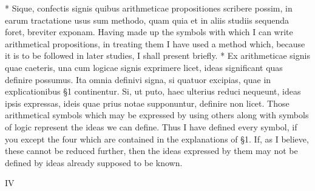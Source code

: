 \documentclass{book}
\newcommand{\s}{\switchcolumn} %
\newcommand{\peanoPage}[1]{\vspace{1ex}

  \columnratio{0.475, 0.05, 0.475} \begin{paracol}{3} \centering \hdashrule{\columnwidth}{0.1mm}{0.1mm 1mm} \s #1 \s \hdashrule{\columnwidth}{0.1mm}{0.1mm 1mm} \end{paracol}

\vspace{1ex}}
\newenvironment{translateTwoCol}
               { %
                 \columnratio{0.5, 0.5}
                 \begin{paracol}{2}
                 \newcommand{\LAT}{\switchcolumn[0]*}
                 \newcommand{\ENG}{\switchcolumn[1]}
               }
               { %
                 \let\ENG\undefined
                 \let\LAT\undefined
                 \end{paracol}
               }
\begin{document}
\begin{translateTwoCol}
\LAT
Sique, confectis signis quibus arithmeticae propositiones scribere possim, in earum tractatione usus sum methodo, quam quia et in aliis studiis sequenda foret, breviter exponam.
\ENG Having made up the symbols with which I can write arithmetical propositions, in treating them I have used a method which, because it is to be followed in later studies, I shall present briefly.
\LAT
Ex arithmeticae signis quae caeteris, una cum logicae signis exprimere licet, ideas significant quas definire possumus. Ita omnia definivi signa, si quatuor excipias, quae in explicationibus \S 1 continentur. Si, ut puto, haec ulterius reduci nequeunt, ideas ipsis expressas, ideis quae prius notae supponuntur, definire non licet.
\ENG Those arithmetical symbols which may be expressed by using others along with symbols of logic represent the ideas we can define. Thus I have defined every symbol, if you except the four which are contained in the explanations of \S 1. If, as I believe, these cannot be reduced further, then the ideas expressed by them may not be defined by ideas already supposed to be known.
\end{translateTwoCol}

\peanoPage{IV} %
\end{document}

